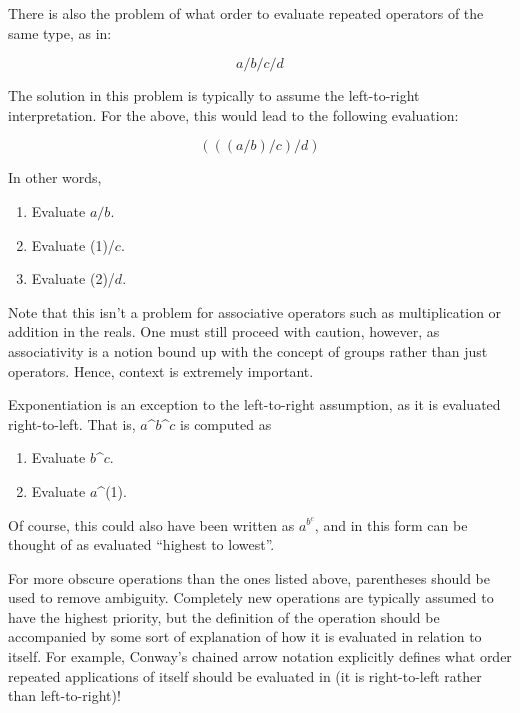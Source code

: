 \documentclass[12pt]{article}
\begin{document}
There is also the problem of what order to evaluate repeated operators of the same type, as in:

$$ a / b / c / d $$

The solution in this problem is typically to assume the left-to-right interpretation.  For the above, this would lead to the following evaluation:

$$ (((a/b)/c)/d) $$

In other words,

\begin{enumerate}
\item Evaluate $a / b$.
\item Evaluate (1)/$c$.
\item Evaluate (2)/$d$.
\end{enumerate}

Note that this isn't a problem for associative operators such as multiplication or addition in the reals.  One must still proceed with caution, however, as associativity is a notion bound up with the concept of groups rather than just operators.   Hence, context is extremely important.

Exponentiation is an exception to the left-to-right assumption, as it is evaluated right-to-left.  That is, $a$\^{}$b$\^{}$c$ is computed as 

\begin{enumerate}
\item Evaluate $b$\^{}$c$.
\item Evaluate $a$\^{}(1).
\end{enumerate}

Of course, this could also have been written as $a^{b^c}$, and in this form can be thought of as evaluated ``highest to lowest''.

For more obscure operations than the ones listed above, parentheses should be used to remove ambiguity.  Completely new operations are typically assumed to have the highest priority, but the definition of the operation should be accompanied by some sort of explanation of how it is evaluated in relation to itself.  For example, Conway's chained arrow notation explicitly defines what order repeated applications of itself should be evaluated in (it is right-to-left rather than left-to-right)!
\end{document}
